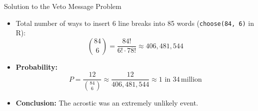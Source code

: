 \documentclass[aspectratio=169]{beamer}
\begin{document}
\begin{frame}{Solution to the Veto Message Problem}
    
    \begin{itemize}
        
        \item Total number of ways to insert 6 line breaks into 85 words (\texttt{choose(84, 6)} in R):
        \[
        \binom{84}{6} = \frac{84!}{6! \cdot 78!} \approx 406,481,544
        \]
        
        \item \textbf{Probability:}
        \[
        P = \frac{12}{\binom{84}{6}} \approx \frac{12}{406,481,544} \approx 1 \text{ in } 34 \, \text{million}
        \]
        
        \item \textbf{Conclusion:} The acrostic was an extremely unlikely event.
    \end{itemize}
    
\end{frame}


\end{document}
